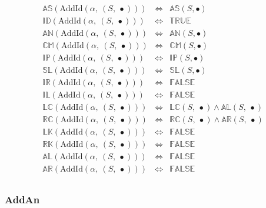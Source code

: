 \documentclass[10pt]{article}
\newcommand{\propname}[1]{{\mathbb{#1}}}
\begin{document}
\[
\begin{array}{rcl} 
\propname{AS}(\mathrm{AddId}(\alpha,\ (S,\ \bullet))) 
  & \Leftrightarrow %
  & \propname{AS}(S, \bullet) \\
\propname{ID}(\mathrm{AddId}(\alpha,\ (S,\ \bullet))) 
  & \Leftrightarrow %
  & \propname{TRUE} \\ 
\propname{AN}(\mathrm{AddId}(\alpha,\ (S,\ \bullet))) 
  & \Leftrightarrow %
  & \propname{AN}(S, \bullet) \\
\propname{CM}(\mathrm{AddId}(\alpha,\ (S,\ \bullet))) 
  & \Leftrightarrow %
  & \propname{CM}(S, \bullet) \\
\propname{IP}(\mathrm{AddId}(\alpha,\ (S,\ \bullet))) 
  & \Leftrightarrow %
  & \propname{IP}(S, \bullet) \\
\propname{SL}(\mathrm{AddId}(\alpha,\ (S,\ \bullet))) 
  & \Leftrightarrow %
  & \propname{SL}(S, \bullet) \\
\propname{IR}(\mathrm{AddId}(\alpha,\ (S,\ \bullet))) 
  & \Leftrightarrow %
  & \propname{FALSE}\\ 
\propname{IL}(\mathrm{AddId}(\alpha,\ (S,\ \bullet))) 
  & \Leftrightarrow %
  & \propname{FALSE}\\ 
\propname{LC}(\mathrm{AddId}(\alpha,\ (S,\ \bullet))) 
  & \Leftrightarrow %
  & \propname{LC}(S,\ \bullet) \wedge \propname{AL}(S,\ \bullet) \\
\propname{RC}(\mathrm{AddId}(\alpha,\ (S,\ \bullet))) 
  & \Leftrightarrow %
  & \propname{RC}(S,\ \bullet) \wedge \propname{AR}(S,\ \bullet) \\
\propname{LK}(\mathrm{AddId}(\alpha,\ (S,\ \bullet))) 
  & \Leftrightarrow %
  & \propname{FALSE}\\ 
\propname{RK}(\mathrm{AddId}(\alpha,\ (S,\ \bullet))) 
  & \Leftrightarrow %
  & \propname{FALSE}\\ 
\propname{AL}(\mathrm{AddId}(\alpha,\ (S,\ \bullet))) 
  & \Leftrightarrow %
  & \propname{FALSE}\\ 
\propname{AR}(\mathrm{AddId}(\alpha,\ (S,\ \bullet))) 
  & \Leftrightarrow %
  & \propname{FALSE}\\ 
\end{array} 
\] 

\subsubsection{AddAn} 
\end{document}
